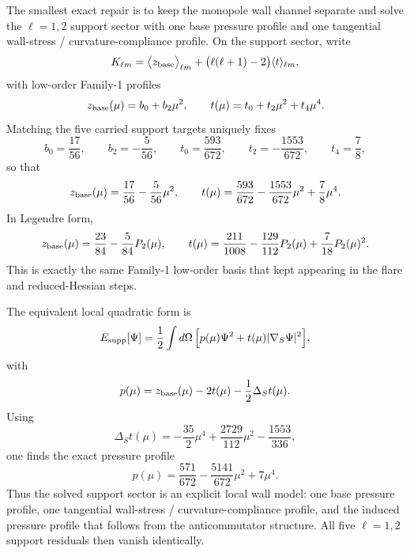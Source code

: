 \documentclass[11pt]{article}
\begin{document}
The smallest exact repair is to keep the monopole wall channel separate and solve the
\(\ell=1,2\) support sector with one base pressure profile and one tangential
wall-stress / curvature-compliance profile.  On the support sector, write
\begin{equation}
K_{\ell m}
=
\big\langle z_{\rm base}\big\rangle_{\ell m}
+
\bigl(\ell(\ell+1)-2\bigr)\langle t\rangle_{\ell m},
\label{eq:family1-traction-Klm}
\end{equation}
with low-order Family-1 profiles
\begin{equation}
z_{\rm base}(\mu)=b_0+b_2\mu^2,
\qquad
t(\mu)=t_0+t_2\mu^2+t_4\mu^4.
\label{eq:family1-t-profile-ansatz}
\end{equation}
Matching the five carried support targets uniquely fixes
\begin{equation}
b_0=\frac{17}{56},
\qquad
b_2=-\frac{5}{56},
\qquad
t_0=\frac{593}{672},
\qquad
t_2=-\frac{1553}{672},
\qquad
t_4=\frac78,
\label{eq:family1-traction-coeffs}
\end{equation}
so that
\begin{equation}
z_{\rm base}(\mu)=\frac{17}{56}-\frac{5}{56}\mu^2,
\qquad
t(\mu)=\frac{593}{672}-\frac{1553}{672}\mu^2+\frac78\mu^4.
\label{eq:family1-zbase-t-final}
\end{equation}
In Legendre form,
\begin{equation}
z_{\rm base}(\mu)=\frac{23}{84}-\frac{5}{84}P_2(\mu),
\qquad
t(\mu)=\frac{211}{1008}-\frac{129}{112}P_2(\mu)+\frac{7}{18}P_2(\mu)^2.
\label{eq:family1-zbase-t-legendre}
\end{equation}
This is exactly the same Family-1 low-order basis that kept appearing in the flare and
reduced-Hessian steps.

The equivalent local quadratic form is
\begin{equation}
E_{\rm supp}[\Psi]
=
\frac12\int d\Omega\,
\Big[p(\mu)\Psi^2+t(\mu)|\nabla_S\Psi|^2\Big],
\label{eq:family1-Esupp}
\end{equation}
with
\begin{equation}
p(\mu)=z_{\rm base}(\mu)-2t(\mu)-\frac12\Delta_S t(\mu).
\label{eq:family1-p-from-t}
\end{equation}
Using
\begin{equation}
\Delta_S t(\mu)
=-\frac{35}{2}\mu^4+\frac{2729}{112}\mu^2-\frac{1553}{336},
\label{eq:family1-DeltaS-t}
\end{equation}
one finds the exact pressure profile
\begin{equation}
p(\mu)=\frac{571}{672}-\frac{5141}{672}\mu^2+7\mu^4.
\label{eq:family1-pressure-profile}
\end{equation}
Thus the solved support sector is an explicit local wall model: one base pressure
profile, one tangential wall-stress / curvature-compliance profile, and the induced
pressure profile that follows from the anticommutator structure.  All five
\(\ell=1,2\) support residuals then vanish identically.
\end{document}
